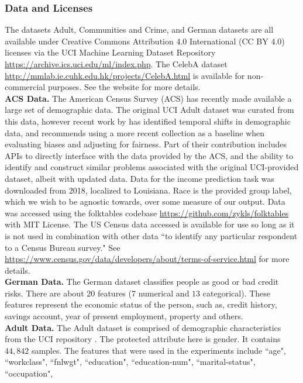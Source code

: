 \subsubsection{Data and Licenses}

The datasets Adult, Communities and Crime, and German datasets are all available under Creative Commons Attribution 4.0 International (CC BY 4.0) licenses via the UCI Machine Learning Dataset Repository \url{https://archive.ics.uci.edu/ml/index.php}.
The CelebA dataset \url{http://mmlab.ie.cuhk.edu.hk/projects/CelebA.html} is available for non-commercial purposes. See the website for more details.\\
{\bf ACS Data.}
The American Census Survey (ACS) has recently made available a large set of demographic data. The original UCI Adult dataset \cite{uci} was curated from this data, however recent work by \cite{ding2021retiring} has identified temporal shifts in demographic data, and recommends using a more recent collection as a baseline when evaluating biases and adjusting for fairness.
Part of their contribution includes APIs to directly interface with the data provided by the ACS, and the ability to identify and construct similar problems associated with the original UCI-provided dataset, albeit with updated data. Data for the income prediction task was downloaded from 2018, localized to Louisiana. 
Race is the provided group label, which we wish to be agnostic towards, over some measure of our output.
Data was accessed using the folktables codebase \url{https://github.com/zykls/folktables} with MIT License. The US Census data accessed is available for use so long as it is not used in combination with other data ``to identify any particular respondent to a Census Bureau survey." See \url{https://www.census.gov/data/developers/about/terms-of-service.html} for more details.\\
{\bf German Data.}
 The German dataset classifies people as good or bad credit risks. There are about $20$ features ($7$ numerical and $13$ categorical). These features represent the economic status of the person, such as, credit history, savings account, year of present employment, property and others. \\
{\bf Adult Data.}
The Adult dataset is comprised of demographic characteristics  from the UCI repository \cite{uci}. The protected attribute here is gender. It contains $44,842$ samples. The features that were used in the experiments include ``age", ``workclass", ``fnlwgt", ``education",                           ``education-num", ``marital-status", ``occupation",
